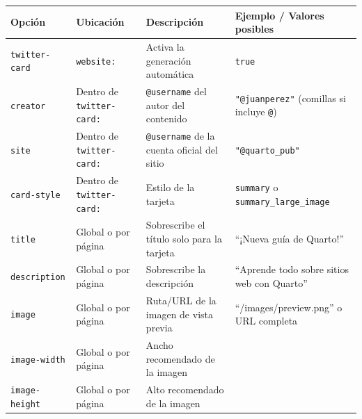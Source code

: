 \documentclass[
  doc,
  floatsintext,
  longtable,
  a4paper,
  nolmodern,
  notxfonts,
  notimes,
  12pt,
  colorlinks=true,linkcolor=blue,citecolor=blue,urlcolor=blue]{apa7}
\newcounter{none} %
\begin{document}
{\def\LTcaptype{none} %
\begin{longtable}[]{@{}
  >{\raggedright\arraybackslash}p{}
  >{\raggedright\arraybackslash}p{}
  >{\raggedright\arraybackslash}p{}
  >{\raggedright\arraybackslash}p{}@{}}
\toprule\noalign{}
\begin{minipage}[b]{\linewidth}\raggedright
Opción
\end{minipage} & \begin{minipage}[b]{\linewidth}\raggedright
Ubicación
\end{minipage} & \begin{minipage}[b]{\linewidth}\raggedright
Descripción
\end{minipage} & \begin{minipage}[b]{\linewidth}\raggedright
Ejemplo / Valores posibles
\end{minipage} \\
\midrule\noalign{}
\endhead
\bottomrule\noalign{}
\endlastfoot
\texttt{twitter-card} & \texttt{website:} & Activa la generación
automática & \texttt{true} \\
\texttt{creator} & Dentro de \texttt{twitter-card:} & \texttt{@username}
del autor del contenido & \texttt{"@juanperez"} (comillas si incluye
\texttt{@}) \\
\texttt{site} & Dentro de \texttt{twitter-card:} & \texttt{@username} de
la cuenta oficial del sitio & \texttt{"@quarto\_pub"} \\
\texttt{card-style} & Dentro de \texttt{twitter-card:} & Estilo de la
tarjeta & \texttt{summary} o \texttt{summary\_large\_image} \\
\texttt{title} & Global o por página & Sobrescribe el título solo para
la tarjeta & ``¡Nueva guía de Quarto!'' \\
\texttt{description} & Global o por página & Sobrescribe la descripción
& ``Aprende todo sobre sitios web con Quarto'' \\
\texttt{image} & Global o por página & Ruta/URL de la imagen de vista
previa & ``/images/preview.png'' o URL completa \\
\texttt{image-width} & Global o por página & Ancho recomendado de la
imagen & 1200 \\
\texttt{image-height} & Global o por página & Alto recomendado de la
imagen & \\
\end{longtable}
}
\end{document}
